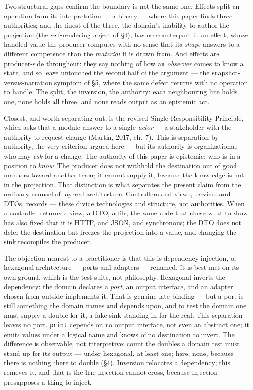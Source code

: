 \documentclass[
]{article}
\newcounter{none} %
\begin{document}
Two structural gaps confirm the boundary is not the same one. Effects
split an operation from its interpretation --- a binary --- where this
paper finds three authorities; and the finest of the three, the domain's
inability to author the projection (the self-rendering object of §4),
has no counterpart in an effect, whose handled value the producer
computes with no sense that its \emph{shape} answers to a different
competence than the \emph{material} it is drawn from. And effects are
producer-side throughout: they say nothing of how an \emph{observer}
comes to know a state, and so leave untouched the second half of the
argument --- the snapshot-versus-narration symptom of §5, where the same
defect returns with no operation to handle. The split, the inversion,
the authority: each neighbouring line holds one, none holds all three,
and none reads output as an epistemic act.

Closest, and worth separating out, is the revised Single Responsibility
Principle, which asks that a module answer to a single \emph{actor} ---
a stakeholder with the authority to request change (Martin, 2017,
ch.~7). This is separation by authority, the very criterion argued here
--- but its authority is organizational: who may \emph{ask} for a
change. The authority of this paper is epistemic: who is in a position
to \emph{know}. The producer does not withhold the destination out of
good manners toward another team; it cannot supply it, because the
knowledge is not in the projection. That distinction is what separates
the present claim from the ordinary counsel of layered architecture.
Controllers and views, services and DTOs, records --- these divide
technologies and structure, not authorities. When a controller returns a
view, a DTO, a file, the same code that chose what to show has also
fixed that it is HTTP, and JSON, and synchronous; the DTO does not defer
the destination but freezes the projection into a value, and changing
the sink recompiles the producer.

The objection nearest to a practitioner is that this is dependency
injection, or hexagonal architecture --- ports and adapters --- renamed.
It is best met on its own ground, which is the test suite, not
philosophy. Hexagonal inverts the dependency: the domain declares a
\emph{port}, an output interface, and an adapter chosen from outside
implements it. That is genuine late binding --- but a port is still
something the domain names and depends upon, and to test the domain one
must supply a double for it, a fake sink standing in for the real. This
separation leaves no port. \texttt{print} depends on no output
interface, not even an abstract one; it emits values under a logical
name and knows of no destination to invert. The difference is
observable, not interpretive: count the doubles a domain test must stand
up for its output --- under hexagonal, at least one; here, none, because
there is nothing there to double (§4). Inversion relocates a dependency;
this removes it, and that is the line injection cannot cross, because
injection presupposes a thing to inject.
\end{document}
